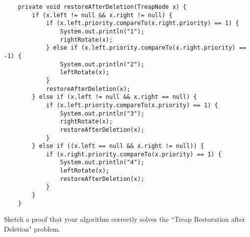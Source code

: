 \documentclass[12pt]{article}
\newenvironment{problem}[2][Problem]{\begin{trivlist}
\item[\hskip \labelsep {\bfseries #1}\hskip \labelsep {\bfseries #2.}]}{\end{trivlist}}
\begin{document}
\begin{verbatim}
    private void restoreAfterDeletion(TreapNode x) {
        if (x.left != null && x.right != null) {
            if (x.left.priority.compareTo(x.right.priority) == 1) {
                System.out.println("1");
                rightRotate(x);
            } else if (x.left.priority.compareTo(x.right.priority) == -1) {
                System.out.println("2");
                leftRotate(x);
            }
            restoreAfterDeletion(x);
        } else if (x.left != null && x.right == null) {
            if (x.left.priority.compareTo(x.priority) == 1) {
                System.out.println("3");
                rightRotate(x);
                restoreAfterDeletion(x);
            }
        } else if ((x.left == null && x.right != null)) {
            if (x.right.priority.compareTo(x.priority) == 1) {
                System.out.println("4");
                leftRotate(x);
                restoreAfterDeletion(x);
            }
        } 
    }
\end{verbatim}


\begin{problem}{9}
Sketch a proof that your algorithm correctly solves the ``Treap Restoration after Deletion" problem.
\end{problem}
\end{document}
